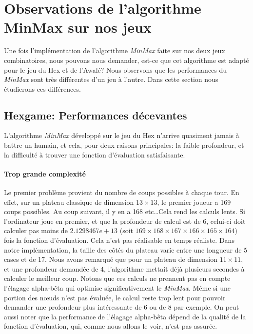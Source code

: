 




\section{Observations de l'algorithme MinMax sur nos jeux}
Une fois l'implémentation de l'algorithme \emph{MinMax} faite sur nos deux
jeux combinatoires, nous pouvons nous demander, est-ce que cet algorithme est adapté pour le jeu du Hex et de l'Awalé?
Nous observons que les performances du \emph{MinMax} sont très différentes d'un jeu à l'autre. Dans cette section nous étudierons ces différences.

\subsection{Hexgame: Performances décevantes}
L'algorithme \emph{MinMax} développé sur le jeu du Hex n'arrive quasiment jamais à battre un humain, et cela, pour
deux raisons principales: la faible profondeur, et la difficulté à trouver une fonction d'évaluation satisfaisante.

\paragraph{Trop grande complexité} Le premier problème provient du nombre de coups possibles à chaque tour.
En effet, sur un plateau classique de dimension $13\times13$, le premier joueur a 169 coups possibles. Au coup suivant, il y en a 168 etc\dots Cela rend les calculs lents. 
Si l'ordinateur joue en premier, et que la profondeur de calcul est de 6, celui-ci doit calculer pas moins de $2.1298467e+13$ (soit $169\times168\times167\times166\times165\times164$)
fois la fonction d'évaluation. Cela n'est pas réalisable en temps réaliste. Dans notre implémentation, la taille des côtés du plateau varie entre
une longueur de 5 cases et de 17. Nous avons remarqué que pour un plateau de dimension $11\times11$, et une profondeur demandée de 4, l'algorithme
mettait déjà plusieurs secondes à calculer le meilleur coup. Notons que ces calculs ne prennent pas en compte l'élagage alpha-bêta
qui optimise significativement le \emph{MinMax}. Même si une portion des nœuds n'est pas évaluée, le calcul reste trop lent pour pouvoir demander une
profondeur plus intéressante de 6 ou de 8 par exemple.
On peut aussi noter que la performance de l'élagage alpha-bêta dépend de la qualité de la fonction d'évaluation, qui, comme nous allons
le voir, n'est pas assurée.

